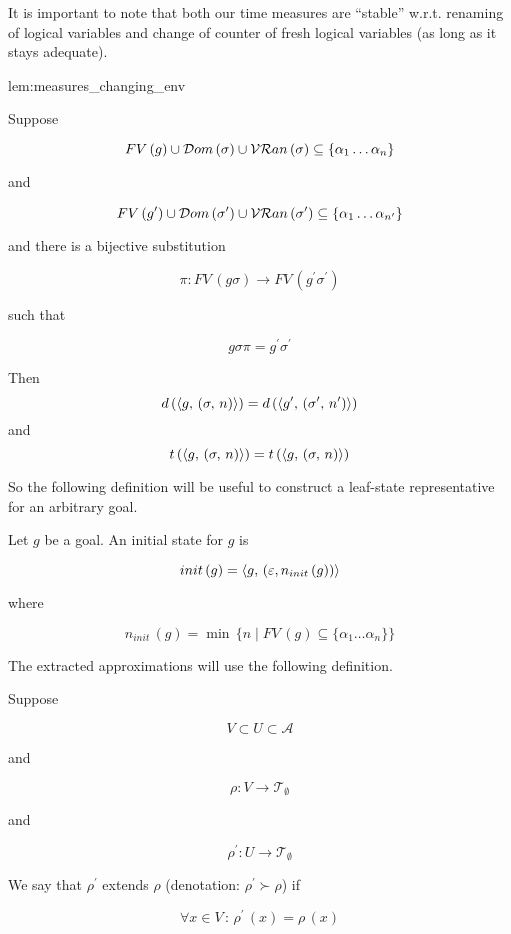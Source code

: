               
It is important to note that both our time measures are ``stable'' w.r.t. renaming of logical variables and change of counter of fresh logical variables (as long as it stays adequate).

\FloatBarrier

\begin{replemma}{lem:measures_changing_env}

  Suppose

  \[ FV\,(g) \cup \mathcal{D}om\,(\sigma) \cup \mathcal{VR}an\,(\sigma) \subseteq \{ \alpha_1\dots\alpha_n \} \]
  
  and

  \[ FV\,(g^\prime) \cup \mathcal{D}om\,(\sigma^\prime) \cup \mathcal{VR}an\,(\sigma^\prime) \subseteq \{ \alpha_1\dots \alpha_{n^\prime} \} \]

  and there is a bijective substitution

  \[\pi \colon FV\,(g \sigma) \to FV\,(g^\prime \sigma^\prime)\]

  such that

  \[ g \sigma \pi = g^\prime \sigma^\prime \]

  Then \[ d\,(\langle g ,\, (\sigma ,\, n) \rangle) = d\,(\langle g^\prime ,\, (\sigma^\prime ,\, n^\prime) \rangle) \] and \[ t\,(\langle g ,\, (\sigma ,\, n) \rangle) = t\,(\langle g ,\, (\sigma ,\, n) \rangle) \] 

\end{replemma}

So the following definition will be useful to construct a leaf-state representative for an arbitrary goal.

\begin{definition} Let $g$ be a goal. An initial state for $g$ is


  \[
   init\,(g)=\langle g ,\, (\varepsilon, n_{init}\,(g)) \rangle
  \]

  where
  
  \[ n_{init}\,(g) = \min\, \{ n \mid FV\,(g) \subseteq \{ \alpha_1\dots\alpha_n \} \} \]
\end{definition}
		
The extracted approximations will use the following definition.

\begin{definition}
  Suppose

  \[V \subset U \subset \mathcal{A}\]

  and

  \[\rho \colon V \to \mathcal{T}_{\emptyset}\]

  and

  \[\rho^\prime \colon U \to \mathcal{T}_{\emptyset}\]

  We say that $\rho^\prime$ extends $\rho$ (denotation: $ \rho^\prime \succ \rho$) if
  
\[ \forall x \in V \,:\, \rho^\prime\,(x) = \rho\,(x) \]
\end{definition}

